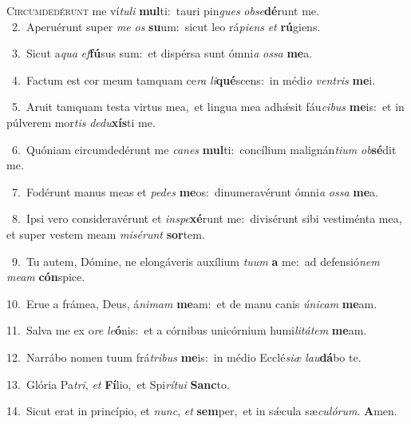 \lettrine{\initial\textcolor{\initialcolor}{C}}{ircumdedérunt} me ví\-\textit{tu}\-\textit{li} \textbf{mul}\-ti:~\star tauri pin\textit{gues} \textit{ob}\-\textit{se}\textbf{dé}runt me.\\
{\numbfont\textcolor{\numbcolor}{~2.}}~Aperuérunt super \textit{me} \textit{os} \textbf{su}\-um:~\star sicut leo rá\-\textit{pi}\-\textit{ens} \textit{et} \textbf{rú}\-giens.\par
{\numbfont\textcolor{\numbcolor}{~3.}}~Sicut a\textit{qua} \textit{ef}\-\textbf{fú}sus sum:~\star et dispérsa sunt ómni\textit{a} \textit{os}\-\textit{sa} \textbf{me}\-a.\par
{\numbfont\textcolor{\numbcolor}{~4.}}~Factum est cor meum tamquam ce\textit{ra} \textit{li}\-\textbf{qué}scens:~\star in médi\textit{o} \textit{ven}\-\textit{tris} \textbf{me}\-i.\par
{\numbfont\textcolor{\numbcolor}{~5.}}~Aruit tamquam testa virtus mea,~\dagger et lingua mea adhǽsit fáu\-\textit{ci}\-\textit{bus} \textbf{me}\-is:~\star et in púlverem mor\textit{tis} \textit{de}\-\textit{du}\textbf{xís}ti me.\par
{\numbfont\textcolor{\numbcolor}{~6.}}~Quóniam circumdedérunt me \textit{ca}\-\textit{nes} \textbf{mul}\-ti:~\star concílium malignán\-\textit{ti}\-\textit{um} \textit{ob}\-\textbf{sé}dit me.\par
{\numbfont\textcolor{\numbcolor}{~7.}}~Fodérunt manus meas et \textit{pe}\-\textit{des} \textbf{me}\-os:~\star dinumeravérunt ómni\textit{a} \textit{os}\-\textit{sa} \textbf{me}\-a.\par
{\numbfont\textcolor{\numbcolor}{~8.}}~Ipsi vero consideravérunt et \textit{in}\-\textit{spe}\textbf{xé}runt me:~\star divisérunt sibi vestiménta mea, et super vestem meam \textit{mi}\-\textit{sé}\textit{runt} \textbf{sor}\-tem.\par
{\numbfont\textcolor{\numbcolor}{~9.}}~Tu autem, Dómine, ne elongáveris auxílium \textit{tu}\-\textit{um} \textbf{a} me:~\star ad defensió\textit{nem} \textit{me}\-\textit{am} \textbf{cón}\-spice.\par
{\numbfont\textcolor{\numbcolor}{10.}}~Erue a frámea, Deus, á\-\textit{ni}\-\textit{mam} \textbf{me}\-am:~\star et de manu canis \textit{ú}\-\textit{ni}\textit{cam} \textbf{me}\-am.\par
{\numbfont\textcolor{\numbcolor}{11.}}~Salva me ex o\textit{re} \textit{le}\-\textbf{ó}nis:~\star et a córnibus unicórnium humi\-\textit{li}\-\textit{tá}\textit{tem} \textbf{me}\-am.\par
{\numbfont\textcolor{\numbcolor}{12.}}~Narrábo nomen tuum frá\-\textit{tri}\-\textit{bus} \textbf{me}\-is:~\star in médio Ecclé\-\textit{si}\-\textit{æ} \textit{lau}\-\textbf{dá}bo te.\par
{\numbfont\textcolor{\numbcolor}{13.}}~Glória Pa\-\textit{tri}\-, \textit{et} \textbf{Fí}\-lio,~\star et Spi\-\textit{rí}\-\textit{tu}\textit{i} \textbf{Sanc}\-to.\par
{\numbfont\textcolor{\numbcolor}{14.}}~Sicut erat in princípio, et \textit{nunc}\-, \textit{et} \textbf{sem}\-per,~\star et in sǽcula sæ\-\textit{cu}\-\textit{ló}\textit{rum}. \textbf{A}\-men.\par
